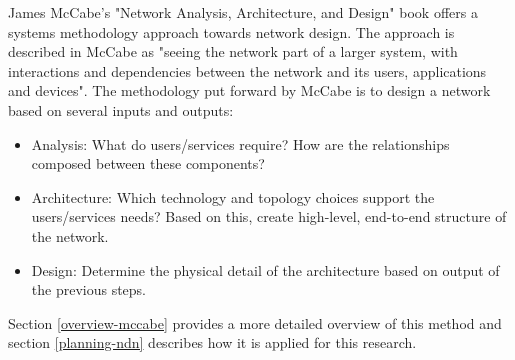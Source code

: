 James McCabe's "Network Analysis, Architecture, and Design" \cite{mccabe2010network} book offers a systems methodology approach towards network design. The approach is described in McCabe as "seeing the network part of a larger system, with interactions and dependencies between the network and its users, applications and devices". The methodology put forward by McCabe is to design a network based on several inputs and outputs:
\begin{itemize}
    \item Analysis: What do users/services require? How are the relationships composed between these components?
    \item Architecture: Which technology and topology choices support the users/services needs? Based on this, create high-level, end-to-end structure of the network.
    \item Design: Determine the physical detail of the architecture based on output of the previous steps.
\end{itemize}


Section \ref{overview-mccabe} provides a more detailed overview of this method and section \ref{planning-ndn} describes how it is applied for this research.


